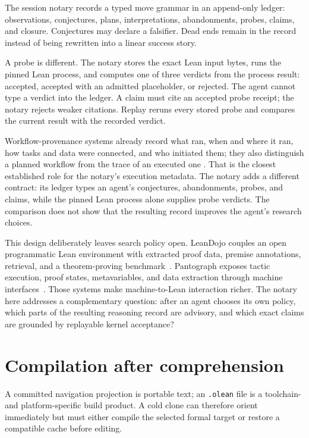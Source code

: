 \documentclass[11pt]{article}
\begin{document}
The session notary records a typed move grammar in an append-only ledger:
observations, conjectures, plans, interpretations, abandonments, probes,
claims, and closure. Conjectures may declare a falsifier. Dead ends remain in
the record instead of being rewritten into a linear success story.

A probe is different. The notary stores the exact Lean input bytes, runs the
pinned Lean process, and computes one of three verdicts from the process
result: accepted, accepted with an admitted placeholder, or rejected. The
agent cannot type a verdict into the ledger. A claim must cite an accepted
probe receipt; the notary rejects weaker citations. Replay reruns every stored
probe and compares the current result with the recorded verdict.

Workflow-provenance systems already record what ran, when and where it ran,
how tasks and data were connected, and who initiated them; they also
distinguish a planned workflow from the trace of an executed one
\cite{workflowprovenance}. That is the closest established role for the
notary's execution metadata. The notary adds a different contract: its ledger
types an agent's conjectures, abandonments, probes, and claims, while the
pinned Lean process alone supplies probe verdicts. The comparison does not show
that the resulting record improves the agent's research choices.

This design deliberately leaves search policy open. LeanDojo couples an open
programmatic Lean environment with extracted proof data, premise annotations,
retrieval, and a theorem-proving benchmark~\cite{leandojo}. Pantograph exposes
tactic execution, proof states, metavariables, and data extraction through
machine interfaces~\cite{pantograph}. Those systems make machine-to-Lean
interaction richer. The notary here addresses a complementary question: after
an agent chooses its own policy, which parts of the resulting reasoning record
are advisory, and which exact claims are grounded by replayable kernel
acceptance?

\section{Compilation after comprehension}\label{sec:incremental}

A committed navigation projection is portable text; an \texttt{.olean} file is
a toolchain- and platform-specific build product. A cold clone can therefore
orient immediately but must either compile the selected formal target or
restore a compatible cache before editing.
\end{document}
